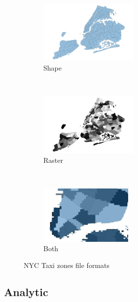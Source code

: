 \documentclass{sigkddExp}
\begin{document}
\begin{figure}
    \centering
    \begin{subfigure}[t]{0.25\textwidth}
        \centering
        \includegraphics[height=1.2in]{images/taxi_zones_shape}
        \caption{Shape}
        \label{fig:zones_shape}
    \end{subfigure}%
    ~ 
    \begin{subfigure}[t]{0.25\textwidth}
        \centering
        \includegraphics[height=1.2in]{images/taxi_zones_raster}
        \caption{Raster}
        \label{fig:zones_raster}
    \end{subfigure}
    ~ 
    \begin{subfigure}[t]{0.5\textwidth}
        \centering
        \includegraphics[width=0.5\textwidth]{images/both}
        \caption{Both}
        \label{fig:zones_both}
    \end{subfigure}
    \caption{NYC Taxi zones file formats}
    \label{fig:zones}
\end{figure}


\subsection{Analytic}

\end{document}
